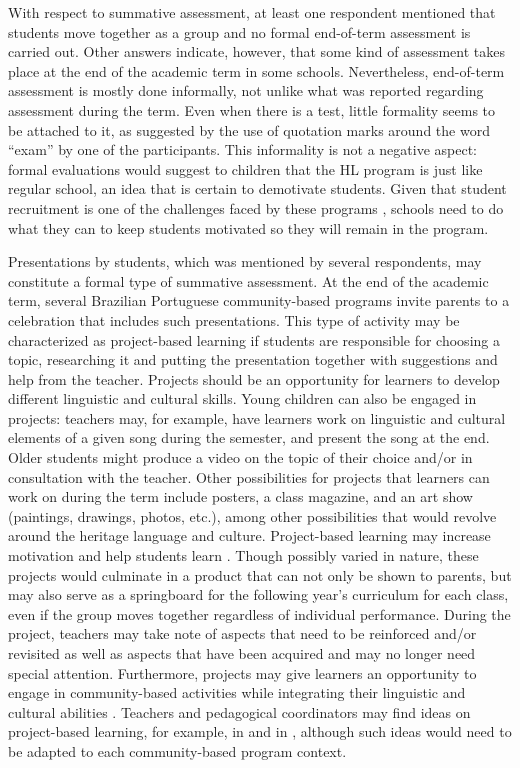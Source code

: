 \documentclass[output=paper]{langscibook}
\begin{document}
  With respect to summative assessment, at least one respondent mentioned that students move together as a group and no formal end-of-term assessment is carried out. Other answers indicate, however, that some kind of assessment takes place at the end of the academic term in some schools. Nevertheless, end-of-term assessment is mostly done informally, not unlike what was reported regarding assessment during the term. Even when there is a test, little formality seems to be attached to it, as suggested by the use of quotation marks around the word “exam” by one of the participants. This informality is not a negative aspect: formal evaluations would suggest to children that the HL program is just like regular school, an idea that is certain to demotivate students. Given that student recruitment is one of the challenges faced by these programs \citep{LiuEtAl2011}, schools need to do what they can to keep students motivated so they will remain in the program.

Presentations by students, which was mentioned by several respondents, may constitute a formal type of summative assessment. At the end of the academic term, several Brazilian Portuguese community-based programs invite parents to a celebration that includes such presentations. This type of activity may be characterized as project-based learning if students are responsible for choosing a topic, researching it and putting the presentation together with suggestions and help from the teacher. Projects should be an opportunity for learners to develop different linguistic and cultural skills. Young children can also be engaged in projects: teachers may, for example, have learners work on linguistic and cultural elements of a given song during the semester, and present the song at the end. Older students might produce a video on the topic of their choice and/or in consultation with the teacher. Other possibilities for projects that learners can work on during the term include posters, a class magazine, and an art show (paintings, drawings, photos, etc.), among other possibilities that would revolve around the heritage language and culture. Project-based learning may increase motivation and help students learn \citep{BlumenfeldPalincsar1991}. Though possibly varied in nature, these projects would culminate in a product that can not only be shown to parents, but may also serve as a springboard for the following year’s curriculum for each class, even if the group moves together regardless of individual performance. During the project, teachers may take note of aspects that need to be reinforced and/or revisited as well as aspects that have been acquired and may no longer need special attention. Furthermore, projects may give learners an opportunity to engage in community-based activities while integrating their linguistic and cultural abilities \citep{Ilieva2007}. Teachers and pedagogical coordinators may find ideas on project-based learning, for example, in \citet{BeckettMiller2006} and in \citet{VacaTorresRodrígues2017}, although such ideas would need to be adapted to each community-based program context.
\end{document}
